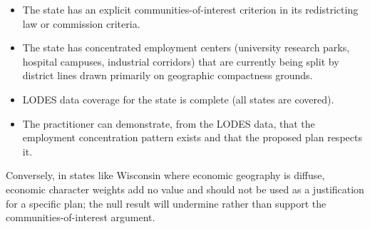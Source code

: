 \begin{itemize}
  \item The state has an explicit communities-of-interest criterion in its
    redistricting law or commission criteria.
  \item The state has concentrated employment centers (university research
    parks, hospital campuses, industrial corridors) that are currently being
    split by district lines drawn primarily on geographic compactness grounds.
  \item LODES data coverage for the state is complete (all states are covered).
  \item The practitioner can demonstrate, from the LODES data, that the
    employment concentration pattern exists and that the proposed plan
    respects it.
\end{itemize}

Conversely, in states like Wisconsin where economic geography is diffuse,
economic character weights add no value and should not be used as a
justification for a specific plan; the null result will undermine rather
than support the communities-of-interest argument.
